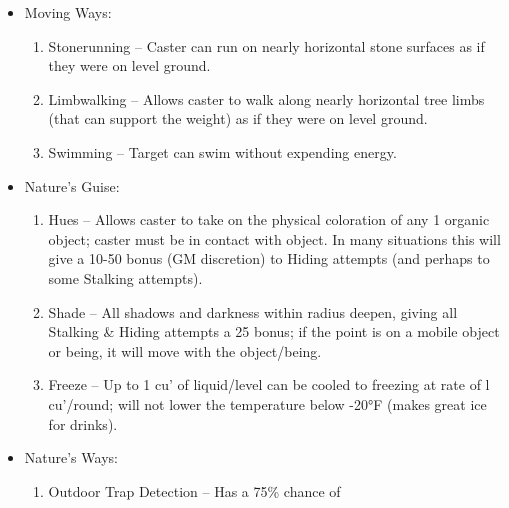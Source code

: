 \documentclass[oneside,12pt]{book}
\begin{document}
\begin{flushleft}
\begin{description}
{\begin{itemize}
\begin{enumerate}
For temperatures above 170°F, subtract 100°F to
determine the effective temperature for the target. Target
also receives a +20 to all RRs vs. heat; +20 DB vs.
elemental fire/heat attacks. If the target is more than 10’
from the caster at any time, the spell is cancelled.
\item Cold Resistance* – Target is protected from natural
cold down to 20°F (treat as if target were in 70°F
temperature). For temperatures below 20°F, add 50°F
to determine the effective temperature for the target.
Target also receives a +20 to all RRs vs. cold; +20 DB
vs. elemental cold/ice attacks. If the target is more than
10’ from the caster at any time, the spell is cancelled.
\item Resistance I – Caster gets a +5 bonus to their RRs
and DB.
\end{enumerate}
\item Moving Ways:
\begin{enumerate}
\scriptsize
\item Stonerunning – Caster can run on nearly horizontal
stone surfaces as if they were on level ground.
\item Limbwalking – Allows caster to walk along nearly
horizontal tree limbs (that can support the weight)
as if they were on level ground.
\item Swimming – Target can swim without expending energy.
\end{enumerate}
\item Nature's Guise:
\begin{enumerate}
\scriptsize
\item Hues – Allows caster to take on the physical
coloration of any 1 organic object; caster must be in
contact with object. In many situations this will give
a 10-50 bonus (GM discretion) to Hiding attempts
(and perhaps to some Stalking attempts).
\item Shade – All shadows and darkness within radius
deepen, giving all Stalking \& Hiding attempts a 25
bonus; if the point is on a mobile object or being, it
will move with the object/being.
\item Freeze – Up to 1 cu’ of liquid/level can be cooled to
freezing at rate of l cu’/round; will not lower the
temperature below -20°F (makes great ice for drinks).
\end{enumerate}
\item Nature's Ways:
\begin{enumerate}
\scriptsize
\item Outdoor Trap Detection – Has a 75\% chance of

\end{enumerate}
\end{itemize}}
\end{description}
\end{flushleft}
\end{document}
